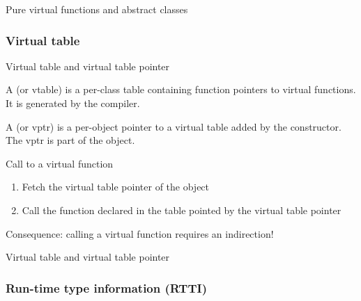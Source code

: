 \begin{frame}{Pure virtual functions and abstract classes}{}
  \begin{example}
  \end{example}
\end{frame}

\subsubsection{Virtual table}

\begin{frame}{Virtual table and virtual table pointer}{}
  \begin{definition}
    A  (or vtable) is a per-class table containing function pointers to virtual functions. It is generated by the compiler.
  \end{definition}

  \begin{definition}
    A  (or vptr) is a per-object pointer to a virtual table added by the constructor. The vptr is part of the object.
  \end{definition}

  \begin{block}{Call to a virtual function}
    \begin{enumerate}
    \item
      Fetch the virtual table pointer of the object
    \item
      Call the function declared in the table pointed by the virtual table pointer
    \end{enumerate}
    Consequence: calling a virtual function requires an indirection!
  \end{block}
\end{frame}

\begin{frame}{Virtual table and virtual table pointer}{}
  \begin{example}
  \end{example}
\end{frame}

\subsubsection{Run-time type information (RTTI)}

